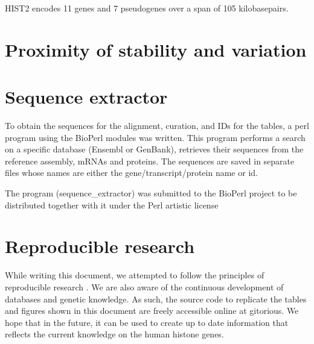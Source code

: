 \documentclass[10pt,a4paper]{article}
\begin{document}
    HIST2 encodes 11 genes and 7 pseudogenes over a span of 105 kilobasepairs.

  \section{Proximity of stability and variation}

  \section{Sequence extractor}
    To obtain the sequences for the alignment, curation, and IDs for the tables, a perl program using the
    BioPerl modules was written. This program performs a search on a specific database (Ensembl or GenBank), retrieves
    their sequences from the reference assembly, mRNAs and proteins. The sequences are saved in separate files whose
    names are either the gene/transcript/protein name or id.
    
    The program (sequence\_extractor) was submitted to the BioPerl project to be distributed together with it under the Perl artistic license

  \section{Reproducible research}
    While writing this document, we attempted to follow the principles of reproducible research \cite{reproducible-research-bioinformatics, reproducible-research-law}.
    We are also aware of the continuous development of databases and genetic knowledge. As such,
    the source code to replicate the tables and figures shown in this document are freely accessible
    online at gitorious. We hope that in the future, it can be used to create up to date information
    that reflects the current knowledge on the human histone genes.
\end{document}
